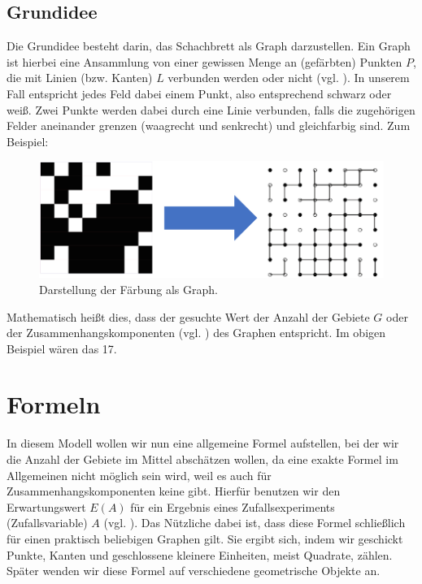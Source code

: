 \documentclass[11pt,a4paper]{article}
\numberwithin{equation}{section}
\numberwithin{table}{section}
\numberwithin{figure}{section}
\begin{document}
\subsection{Grundidee}
Die Grundidee besteht darin, das Schachbrett als Graph darzustellen. Ein Graph ist hierbei eine Ansammlung von einer gewissen Menge an (gefärbten) Punkten $P$, die mit Linien (bzw. Kanten) $L$ verbunden werden oder nicht (vgl. \cite{graph}). In unserem Fall entspricht jedes Feld dabei einem Punkt, also entsprechend schwarz oder weiß. Zwei Punkte werden dabei durch eine Linie verbunden, falls die zugehörigen Felder aneinander grenzen (waagrecht und senkrecht) und gleichfarbig sind.  Zum Beispiel:\begin{center}
\begin{figure}[H]\label{bild2}
\begin{center}\includegraphics[scale=0.5]{2.png}
\caption{Darstellung der Färbung als Graph.}\end{center}
\end{figure}
\end{center}
Mathematisch heißt dies, dass der gesuchte Wert der Anzahl der Gebiete $G$ oder der Zusammenhangskomponenten (vgl. \cite{zusammenhangskomponente}) des Graphen entspricht. Im obigen Beispiel wären das 17. \par\noindent


\section{Formeln}
In diesem Modell wollen wir nun eine allgemeine Formel aufstellen, bei der wir die Anzahl der Gebiete im Mittel abschätzen wollen, da eine exakte Formel im Allgemeinen nicht möglich sein wird, weil es auch für Zusammenhangskomponenten keine gibt.  Hierfür benutzen wir den Erwartungswert $E(A)$ für ein Ergebnis eines Zufallsexperiments (Zufallsvariable) $A$ (vgl. \cite[S. 133]{mathe09}). Das Nützliche dabei ist, dass diese Formel schließlich für einen praktisch beliebigen Graphen gilt. Sie ergibt sich, indem wir geschickt Punkte, Kanten und geschlossene kleinere Einheiten, meist Quadrate, zählen. Später wenden wir diese Formel auf verschiedene geometrische Objekte an. 
\end{document}
